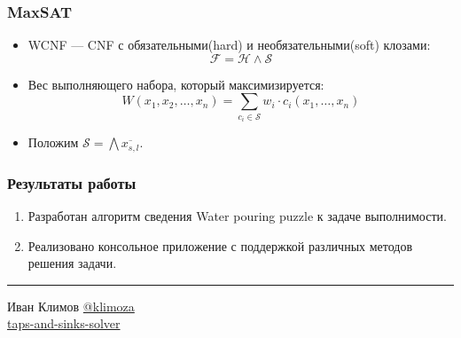\documentclass[14pt,aspectratio=169,hyperref={pdftex,unicode},xcolor=dvipsnames]{beamer}
\begin{document}
\begin{frame}
\frametitle{MaxSAT}
\begin{itemize}
  \item WCNF --- CNF с обязательными(hard) и необязательными(soft) клозами:
    \begin{equation*}
      \mathcal{F} = \mathcal{H} \wedge \mathcal{S}
    \end{equation*}
  \item Вес выполняющего набора, который максимизируется:
  \begin{equation*}
    W(x_1, x_2, \dotsc, x_n) = \sum\limits_{c_i \in \mathcal{S}} w_i \cdot c_i(x_1, \dotsc, x_n)
  \end{equation*}
  \item Положим $\mathcal{S} = \bigwedge \overline{x_{s, l}}$.
\end{itemize}
\end{frame}

\begin{frame}
\frametitle{Результаты работы}

\begin{enumerate}
\item Разработан алгоритм сведения Water pouring puzzle к задаче выполнимости.
\item Реализовано консольное приложение с поддержкой различных методов решения задачи.
\end{enumerate}

\vspace{5mm}\hrule\vspace{3mm}


\begin{multicols}{2}
\begin{center}
  \mbox{}\hfill Иван Климов \href{https://t.me/klimoza}{@klimoza} \\
  \mbox{}\hfill \href{https://github.com/klimoza/taps-and-sinks-solver}{taps-and-sinks-solver}
\end{center}
\columnbreak
\begin{center}
\end{center}
\end{multicols}

\end{frame}
\end{document}
